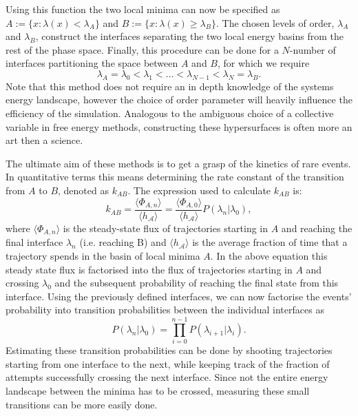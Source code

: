 Using this function the two local minima can
now be specified as $A := \{x: \lambda(x) < \lambda_A\} $ and $B := \{x: \lambda(x) \geq
\lambda_B\} $. The chosen levels of order, $\lambda_A$ and $\lambda_B$, construct the
interfaces separating the two local energy basins from the rest of the
phase space. Finally, this procedure can be done for a $N$-number of interfaces
partitioning the space between $A$ and  $B$, for which we require
\begin{equation}
\lambda_A = \lambda_0 < \lambda_1< \dots < \lambda_{N-1} < \lambda_N = \lambda_B.
\end{equation}
Note that this method does not require an in depth knowledge of the systems energy
landscape, however the choice of order parameter will heavily influence the
efficiency of the simulation. Analogous to the ambiguous choice of a collective variable
in free energy methods, constructing these hypersurfaces is often more an art then a
science.

The ultimate aim of these methods is to get a grasp of the kinetics of rare events. In
quantitative terms this means determining the rate constant of the transition
from $A$ to  $B$, denoted as $k_{AB}$. The expression used to calculate $k_{AB}$ is:
 \begin{equation}
    k_{AB} = \frac{\langle \Phi_{A,n} \rangle}{\langle h_{\mathcal{A}}\rangle} =
    \frac{\langle \Phi_{A,0} \rangle}{\langle h_{\mathcal{A}}\rangle}
    P(\lambda_n|\lambda_0),
 \end{equation}
 where $\langle \Phi_{A,n} \rangle$ is the steady-state flux of trajectories starting in
 $A$ and reaching the final interface $\lambda_n$ (i.e. reaching B) and
$\langle h_{\mathcal{A}}\rangle$ is the average fraction of time that  a trajectory
spends in the basin of local minima $A$. In the above equation this steady state flux is
factorised into the flux of trajectories starting in $A$ and crossing $\lambda_0$ and the
subsequent probability of reaching the final state from this
interface. Using the previously defined interfaces, we can now factorise the events'
probability into transition probabilities between the individual interfaces as
\begin{equation}
    P(\lambda_n|\lambda_0) = \prod_{i=0}^{n-1} P(\lambda_{i+1}|\lambda_i).
 \end{equation}
Estimating these transition probabilities can be done by shooting trajectories starting
from one interface to the next, while keeping track of the fraction of attempts
successfully crossing the next interface. Since not the entire energy landscape between
the minima has to be crossed, measuring these small transitions can be more easily done.

